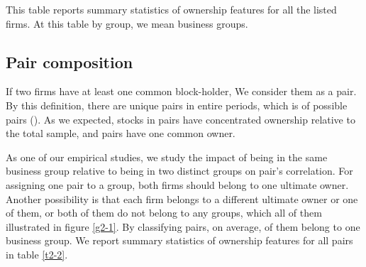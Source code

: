 	{	 \begin{table}[htbp]
		\centering
		\caption{ This table reports summary statistics of ownership features for all the listed firms. At this table by group, we mean business groups.}
		\label{t2-1}
		\resizebox{1\textwidth}{!}
		{
			
		}
\end{table}}




\subsection{{Pair composition} }

	If two firms have at least one common block-holder, We consider them as a pair. By this definition, there are   unique pairs in entire periods, which is of possible pairs (). As we expected, stocks in pairs have concentrated ownership relative to the total sample, and pairs have one common owner.
	
	\normalcolor
	
	As one of our empirical studies, we study the impact of being in the same business group relative to being in two distinct groups on pair's correlation. 
	For assigning one pair to a group, both firms should belong to one ultimate owner. Another possibility is that each firm belongs to a different ultimate owner or one of them, or both of them do not belong to any groups, which all of them illustrated in figure \ref{g2-1}.
	By classifying pairs, on average, of them  belong to one business group. We report summary statistics of ownership features for all pairs in table \ref{t2-2}.
	
